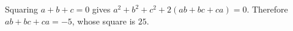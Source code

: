 Squaring $a+b+c=0$ gives $a^2+b^2+c^2+2(ab+bc+ca)=0$. Therefore $ab+bc+ca=-5$, whose square is $\boxed{25}$.
